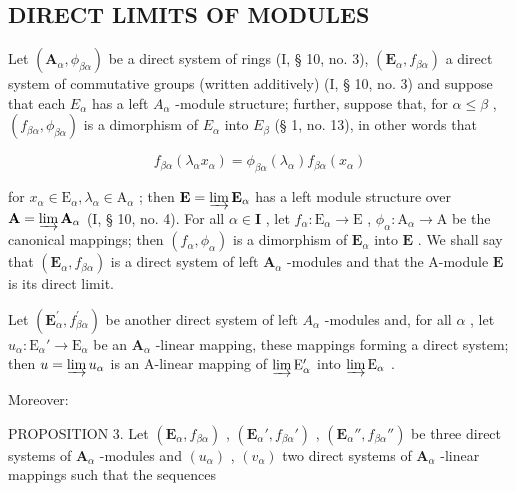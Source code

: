 \subsection{DIRECT LIMITS OF MODULES}


Let \((\mathbf{A}_{\alpha}, \phi_{\beta\alpha})\) be a direct system of rings (I, § 10, no. 3), \((\mathbf{E}_{\alpha}, f_{\beta\alpha})\) a direct system of commutative groups (written additively) (I, § 10, no. 3) and suppose that each \(E_{\alpha}\) has a left \(A_{\alpha}\) -module structure; further, suppose that, for \(\alpha \leqslant \beta\) , \((f_{\beta\alpha}, \phi_{\beta\alpha})\) is a dimorphism of \(E_{\alpha}\) into \(E_{\beta}\) (§ 1, no. 13), in other words that

\[
f _ {\beta \alpha} (\lambda_ {\alpha} x _ {\alpha}) = \phi_ {\beta \alpha} (\lambda_ {\alpha}) f _ {\beta \alpha} (x _ {\alpha})\tag{4}
\]

for \(x_{\alpha} \in \mathrm{E}_{\alpha}, \lambda_{\alpha} \in \mathrm{A}_{\alpha}\) ; then \(\mathbf{E} = \varinjlim \mathbf{E}_{\alpha}\) has a left module structure over \(\mathbf{A} = \varinjlim \mathbf{A}_{\alpha}\) (I, § 10, no. 4). For all \(\alpha \in \mathbf{I}\) , let \(f_{\alpha}: \mathrm{E}_{\alpha} \to \mathrm{E}\) , \(\phi_{\alpha}: \mathrm{A}_{\alpha} \to \mathrm{A}\) be the canonical mappings; then \((f_{\alpha}, \phi_{\alpha})\) is a dimorphism of \(\mathbf{E}_{\alpha}\) into \(\mathbf{E}\) . We shall say that \((\mathbf{E}_{\alpha}, f_{\beta \alpha})\) is a direct system of left \(\mathbf{A}_{\alpha}\) -modules and that the A-module \(\mathbf{E}\) is its direct limit.

Let \((\mathbf{E}_{\alpha}^{\prime}, f_{\beta \alpha}^{\prime})\) be another direct system of left \(A_{\alpha}\) -modules and, for all \(\alpha\) , let \(u_{\alpha}: \mathrm{E}_{\alpha}' \to \mathrm{E}_{\alpha}\) be an \(\mathbf{A}_{\alpha}\) -linear mapping, these mappings forming a direct system; then \(u = \varinjlim u_{\alpha}\) is an A-linear mapping of \(\varinjlim \mathrm{E}_{\alpha}'\) into \(\varinjlim \mathrm{E}_{\alpha}\) .

Moreover:

PROPOSITION 3. Let \((\mathbf{E}_{\alpha}, f_{\beta \alpha})\) , \((\mathbf{E}_{\alpha}', f_{\beta \alpha}')\) , \((\mathbf{E}_{\alpha}'', f_{\beta \alpha}'')\) be three direct systems of \(\mathbf{A}_{\alpha}\) -modules and \((u_{\alpha})\) , \((v_{\alpha})\) two direct systems of \(\mathbf{A}_{\alpha}\) -linear mappings such that the sequences

